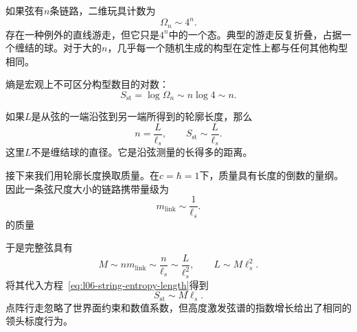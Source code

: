 如果弦有\(n\)条链路，二维玩具计数为
\begin{equation}
\Omega_n\sim4^n.
\label{eq:l06-walk-count}
\end{equation}
存在一种例外的直线游走，但它只是\(4^n\)中的一个态。典型的游走反复折叠，占据一个缠结的球。对于大的\(n\)，几乎每一个随机生成的构型在定性上都与任何其他构型相同。

熵是宏观上不可区分构型数目的对数：
\begin{equation}
S_{\mathrm{st}}=\log\Omega_n\sim n\log4\sim n.
\label{eq:l06-string-entropy-n}
\end{equation}

\begin{classroomqa}
\end{classroomqa}

如果\(L\)是从弦的一端沿弦到另一端所得到的轮廓长度，那么
\begin{equation}
n=\frac{L}{\ell_s},
\qquad
S_{\mathrm{st}}\sim\frac{L}{\ell_s}.
\label{eq:l06-string-entropy-length}
\end{equation}
这里\(L\)不是缠结球的直径。它是沿弦测量的长得多的距离。

接下来我们用轮廓长度换取质量。在\(c=\hbar=1\)下，质量具有长度的倒数的量纲。因此一条弦尺度大小的链路携带量级为
\begin{equation}
m_{\mathrm{link}}\sim\frac{1}{\ell_s}.
\label{eq:l06-link-mass}
\end{equation}的质量

\begin{classroomqa}
\end{classroomqa}

于是完整弦具有
\begin{equation}
M\sim n m_{\mathrm{link}}
\sim\frac{n}{\ell_s}
\sim\frac{L}{\ell_s^2},
\qquad
L\sim M\ell_s^2.
\label{eq:l06-string-mass}
\end{equation}
将其代入方程~\eqref{eq:l06-string-entropy-length}得到
\begin{equation}
S_{\mathrm{st}}\sim M\ell_s.
\label{eq:l06-string-entropy-mass}
\end{equation}
点阵行走忽略了世界面约束和数值系数，但高度激发弦谱的指数增长给出了相同的领头标度行为。

